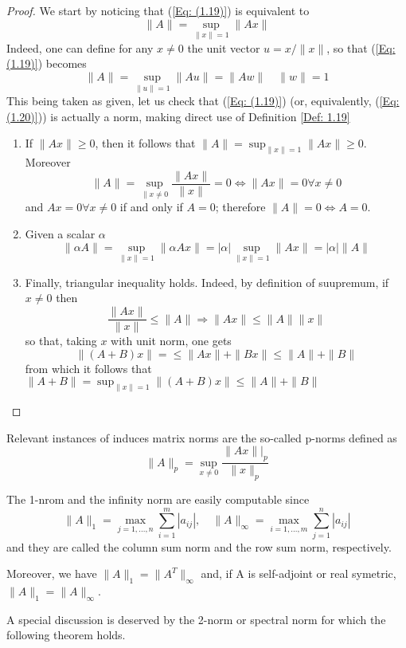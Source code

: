 \begin{proof}
    We start by noticing that (\ref{Eq: (1.19)}) is equivalent to 
    \begin{equation}
        \|A\| = \sup_{\|x\| = 1}{\|Ax\|}
        \label{Eq: (1.20)}
    \end{equation}
    Indeed, one can define for any $x \neq 0 $ the unit vector $u = x / \|x\|$, so that (\ref{Eq: (1.19)}) becomes
    \[ \|A\| = \sup_{\|u\| = 1}{\|Au\|} = \|Aw\| \quad \|w\| = 1 \]
    This being taken as given, let us check that (\ref{Eq: (1.19)}) (or, equivalently, (\ref{Eq: (1.20)})) is actually a norm, making direct use of Definition \ref{Def: 1.19}
    \begin{enumerate}
        \item If $\|Ax\| \geq 0$, then it follows that $\|A\| =  \sup_{\|x\| = 1}{\|Ax\| \geq 0}$. Moreover
        \[ \|A\| = \sup_{\|x \neq 0}{\frac{\|Ax\|}{\|x\|}} = 0 \Leftrightarrow \|Ax\| = 0 \forall x \neq 0\]
        and $Ax = 0 \forall x \neq 0$ if and only if $A = 0$; therefore $\|A\| = 0 \Leftrightarrow A = 0$.
        \item Given a scalar $\alpha$
        \[ \|\alpha A\| = \sup_{\|x\|=1}{\|\alpha A x\|} = |\alpha| \sup_{\|x\| = 1} {\|Ax\|} = |\alpha| \|A\| \]
        \item Finally, triangular inequality holds. Indeed, by definition of suupremum, if $x \neq 0$ then 
        \[ \frac{\|Ax\|}{\|x\|} \leq \|A\| \Rightarrow \|Ax\| \leq \|A\| \|x\|\]
        so that, taking $x$ with unit norm, one gets 
        \[ \|(A + B)x\| = \leq \|Ax\| + \|Bx\| \leq  \|A\| + \|B\| \]
        from which it follows that $\|A+B\| = \sup_{\|x\|= 1}{\|(A+ B) x\|} \leq \|A\| + \|B\|$
    \end{enumerate}
\end{proof}

Relevant instances of induces matrix norms are the so-called p-norms defined as 
\[\|A\|_p = \sup_{x \neq 0}{\frac{\|Ax\||_p}{\|x\|_p}}\]

The 1-nrom and the infinity norm are easily computable since
\[ \|A\|_1 = \max_{j = 1,...,n}{\sum_{i = 1}^{m}{|a_{ij}|}}, \quad \|A\|_\infty = \max_{i=1,...,m}{\sum_{j = 1}^{n}{|a_{ij}|}} \]
and they are called the column sum norm and the row sum norm, respectively.

Moreover, we have $\|A\|_1 = \|A^T\|_\infty$ and, if A is self-adjoint or real symetric, $\|A\|_1 = \|A\|_\infty$.

A special discussion is deserved by the 2-norm or spectral norm for which the following theorem holds.

